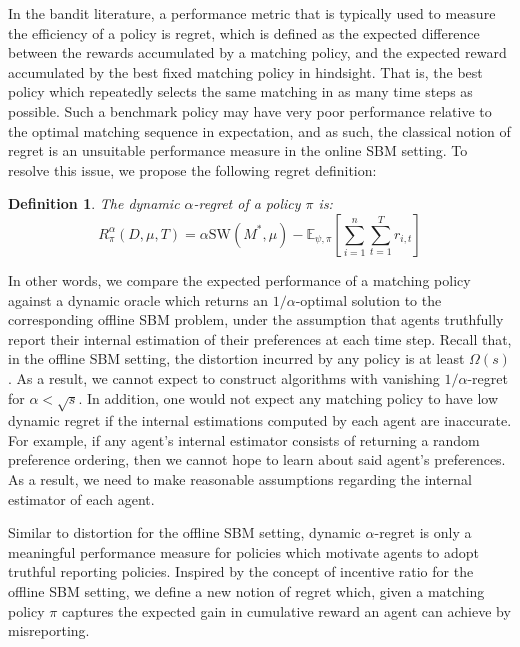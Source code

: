 \documentclass[letterpaper,11pt]{article}
\newtheorem{defn}{Definition}
\begin{document}
In the bandit literature, a performance metric that is typically used to measure the efficiency of a policy is regret, which is defined as the expected difference between the rewards accumulated by a matching policy, and the expected reward accumulated by the best fixed matching policy in hindsight. That is, the best policy which repeatedly selects the same matching in as many time steps as possible. Such a benchmark policy may have very poor performance relative to the optimal matching sequence in expectation, and as such, the classical notion of regret is an unsuitable performance measure in the online SBM setting. To resolve this issue, we propose the following regret definition:
\begin{defn}
    The dynamic $\alpha$-regret of a policy $\pi$ is:
    \begin{equation*}
        R^{\alpha}_{\pi}(D, \mu, T) = \alpha\textrm{SW}(M^{*}, \mu) - \mathbb{E}_{\psi, \pi}\left[\sum^{n}_{i=1}\sum^{T}_{t=1}r_{i, t}\right] 
    \end{equation*}
\end{defn}
In other words, we compare the expected performance of a matching policy against a dynamic oracle which returns an  $1/\alpha$-optimal solution to the corresponding offline SBM problem, under the assumption that agents truthfully report their internal estimation of their preferences at each time step. Recall that, in the offline SBM setting, the distortion incurred by any policy is at least $\Omega(s)$. As a result, we cannot expect to construct algorithms with vanishing $1/\alpha$-regret for $\alpha < \sqrt{s}$.
In addition, one would not expect any matching policy to have low dynamic regret if the internal estimations computed by each agent are inaccurate. For example, if any agent's internal estimator consists of returning a random preference ordering, then we cannot hope to learn about said agent's preferences. As a result, we need to make reasonable assumptions regarding the internal estimator of each agent.

Similar to distortion for the offline SBM setting, dynamic $\alpha$-regret is only a meaningful performance measure for policies which motivate agents to adopt truthful reporting policies. Inspired by the concept of incentive ratio for the offline SBM setting, we define a new notion of regret which, given a matching policy $\pi$ captures the expected gain in cumulative reward an agent can achieve by misreporting.
\end{document}
